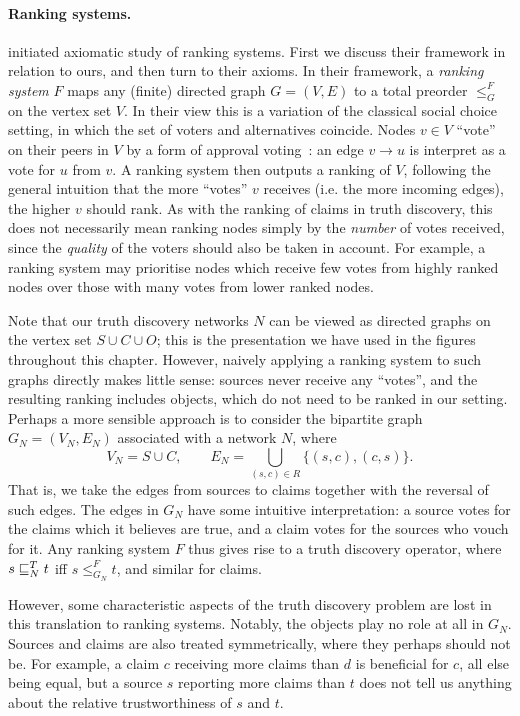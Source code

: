 \paragraph{Ranking systems.} \textcite{altman2008} initiated axiomatic study of
ranking systems. First we discuss their framework in relation to ours, and then
turn to their axioms. In their framework, a \emph{ranking system} $F$ maps any
(finite) directed graph $G = (V, E)$ to a total preorder $\le_G^F$ on the
vertex set $V$. In their view this is a variation of the classical social
choice setting, in which the set of voters and alternatives coincide. Nodes $v
\in V$ ``vote'' on their peers in $V$ by a form of approval
voting~\cite{laslier2010handbook}: an edge $v \to u$ is interpret as a vote for
$u$ from $v$. A ranking system then outputs a ranking of $V$, following the
general intuition that the more ``votes'' $v$ receives (i.e. the more incoming
edges), the higher $v$ should rank. As with the ranking of claims in truth
discovery, this does not necessarily mean ranking nodes simply by the
\emph{number} of votes received, since the \emph{quality} of the voters should
also be taken in account. For example, a ranking system may prioritise nodes
which receive few votes from highly ranked nodes over those with many votes
from lower ranked nodes.

Note that our truth discovery networks $N$ can be viewed as directed graphs on
the vertex set $S \cup C \cup O$; this is the presentation we have used in the
figures throughout this chapter. However, naively applying a ranking system to
such graphs directly makes little sense: sources never receive any ``votes'',
and the resulting ranking includes objects, which do not need to be ranked in
our setting. Perhaps a more sensible approach is to consider the bipartite
graph $G_N = (V_N, E_N)$ associated with a network $N$, where
\[
    V_N = S \cup C, \qquad E_N = \bigcup_{(s, c) \in R}{ \{(s, c), (c, s)\} }.
\]
That is, we
take the edges from sources to claims together with the reversal of such edges.
The edges in $G_N$ have some intuitive interpretation: a source votes for the
claims which it believes are true, and a claim votes for the sources who vouch for
it.  Any ranking system $F$ thus gives rise to a truth discovery operator,
where $s \sqsubseteq_N^T t$ iff $s \le_{G_N}^F t$, and similar for claims.

However, some characteristic aspects of the truth discovery problem are lost in
this translation to ranking systems. Notably, the objects play no role at all
in $G_N$. Sources and claims are also treated symmetrically, where they perhaps
should not be. For example, a claim $c$ receiving more claims than $d$ is
beneficial for $c$, all else being equal, but a source $s$
reporting more claims than $t$ does not tell us anything about the relative
trustworthiness of $s$ and $t$.

